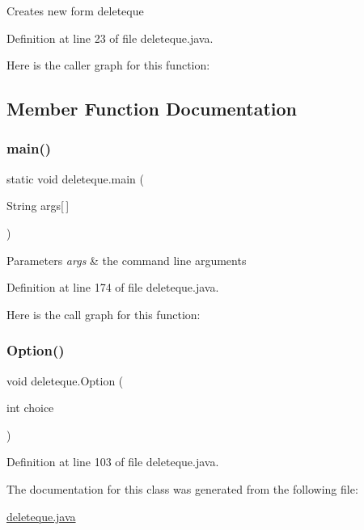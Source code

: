 Creates new form deleteque 

Definition at line 23 of file deleteque.\+java.

Here is the caller graph for this function\+:


\subsection{Member Function Documentation}
\mbox{\label{classdeleteque_a5cad2fb99254daf5d9049ce984b85e5d}} 
\subsubsection{\texorpdfstring{main()}{main()}}
{\footnotesize\ttfamily static void deleteque.\+main (\begin{DoxyParamCaption}\item[{String}]{args\mbox{[}$\,$\mbox{]} }\end{DoxyParamCaption})\hspace{0.3cm}{\ttfamily [static]}}


\begin{DoxyParams}{Parameters}
{\em args} & the command line arguments \\
\hline
\end{DoxyParams}


Definition at line 174 of file deleteque.\+java.

Here is the call graph for this function\+:
\mbox{\label{classdeleteque_a02bcbd1b4cd9a0de2b33aee34e5c102b}} 
\subsubsection{\texorpdfstring{Option()}{Option()}}
{\footnotesize\ttfamily void deleteque.\+Option (\begin{DoxyParamCaption}\item[{int}]{choice }\end{DoxyParamCaption})}



Definition at line 103 of file deleteque.\+java.



The documentation for this class was generated from the following file\+:\begin{DoxyCompactItemize}
\item 
\mbox{\hyperlink{deleteque_8java}{deleteque.\+java}}\end{DoxyCompactItemize}
